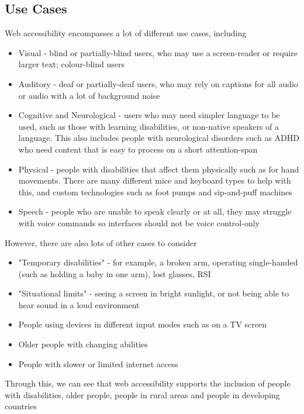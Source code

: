 \documentclass[ %
                    author={Aleena Baig},
                supervisor={Dr Simon Lock},
                    degree={BSc},
                     title={On Making Web Accessible Graphs},
                  subtitle={},
                      year={2019} ]{dissertation}
\begin{document}
\subsection{Use Cases}

Web accessibility encompasses a lot of different use cases, including

\begin{itemize}
    \item Visual - blind or partially-blind users, who may use a screen-reader or require larger text; colour-blind users
    \item Auditory - deaf or partially-deaf users, who may rely on captions for all audio or audio with a lot of background noise
    \item Cognitive and Neurological - users who may need simpler language to be used, such as those with learning disabilities, or non-native speakers of a language. This also includes people with neurological disorders such as ADHD who need content that is easy to process on a short attention-span
    \item Physical - people with disabilities that affect them physically such as for hand movements. There are many different mice and keyboard types to help with this, and custom technologies such as foot pumps and sip-and-puff machines
    \item Speech - people who are unable to speak clearly or at all, they may struggle with voice commands so interfaces should not be voice control-only
\end{itemize}


However, there are also lots of other cases to consider \cite{WAIaccessibilityintro}
%
\begin{itemize}
    \item "Temporary disabilities" - for example, a broken arm, operating single-handed (such as holding a baby in one arm), lost glasses, RSI
    \item "Situational limits" - seeing a screen in bright sunlight, or not being able to hear sound in a loud environment
    \item People using devices in different input modes such as on a TV screen
    \item Older people with changing abilities
    \item People with slower or limited internet access
\end{itemize}

Through this, we can see that web accessibility supports the inclusion of people with disabilities, older people, people in rural areas and people in developing countries
\end{document}
